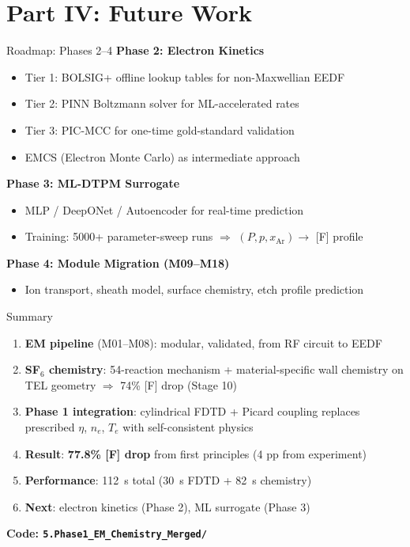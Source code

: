 \documentclass[aspectratio=169,10pt]{beamer}
\newcommand{\Te}{T_e}
\begin{document}
\section{Part IV: Future Work}

\begin{frame}{Roadmap: Phases 2--4}
  \textbf{Phase 2: Electron Kinetics}
  \begin{itemize}[]
    \item Tier 1: BOLSIG+ offline lookup tables for non-Maxwellian EEDF
    \item Tier 2: PINN Boltzmann solver for ML-accelerated rates
    \item Tier 3: PIC-MCC for one-time gold-standard validation
    \item EMCS (Electron Monte Carlo) as intermediate approach
  \end{itemize}
  \vspace{0.3cm}
  \textbf{Phase 3: ML-DTPM Surrogate}
  \begin{itemize}[]
    \item MLP / DeepONet / Autoencoder for real-time prediction
    \item Training: 5000+ parameter-sweep runs $\Rightarrow$ $(P, p, x_\mathrm{Ar}) \to$ [F] profile
  \end{itemize}
  \vspace{0.3cm}
  \textbf{Phase 4: Module Migration (M09--M18)}
  \begin{itemize}[]
    \item Ion transport, sheath model, surface chemistry, etch profile prediction
  \end{itemize}
\end{frame}

\begin{frame}{Summary}
  \begin{enumerate}
    \item \textbf{EM pipeline} (M01--M08): modular, validated, from RF circuit to EEDF
    \item \textbf{SF$_6$ chemistry}: 54-reaction mechanism + material-specific wall chemistry on TEL geometry $\Rightarrow$ 74\% [F] drop (Stage 10)
    \item \textbf{Phase 1 integration}: cylindrical FDTD + Picard coupling replaces prescribed $\eta$, $n_e$, $\Te$ with self-consistent physics
    \item \textbf{Result}: \textbf{77.8\% [F] drop} from first principles (4 pp from experiment)
    \item \textbf{Performance}: \SI{112}{\second} total (\SI{30}{\second} FDTD + \SI{82}{\second} chemistry)
    \item \textbf{Next}: electron kinetics (Phase 2), ML surrogate (Phase 3)
  \end{enumerate}

  \vspace{0.4cm}
  \centering
  \large\textbf{Code: \texttt{5.Phase1\_EM\_Chemistry\_Merged/}}
\end{frame}
\end{document}
